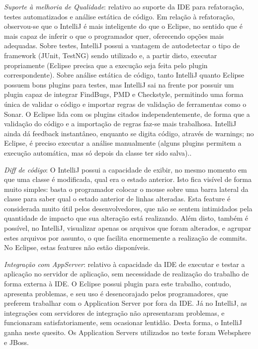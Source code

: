 \documentclass[12pt,journal,compsoc]{IEEEtran}
\begin{document}
\emph{Suporte à melhoria de Qualidade}: relativo ao suporte da IDE para refatoração, testes automatizados e análise estática de código. Em relação à refatoração, observou-se que o IntelliJ é mais inteligente do que o Eclipse, no sentido que é mais capaz de inferir o que o programador quer, oferecendo opções mais adequadas.\cite{idea_better_eclipse} Sobre testes, IntelliJ possui a vantagem de autodetectar o tipo de framework (JUnit, TestNG) sendo utilizado e, a partir disto, executar propriamente (Eclipse precisa que a execução seja feita pelo plugin correspondente). Sobre análise estática de código, tanto IntelliJ quanto Eclipse possuem bons plugins para testes, mas IntelliJ sai na frente por possuir um plugin capaz de integrar FindBugs, PMD e Checkstyle, permitindo uma forma única de validar o código e importar regras de validação de ferramentas como o Sonar. O Eclipse lida com os plugins citados independentemente, de forma que a validação do código e a importação de regras faz-se mais trabalhosa. IntelliJ ainda dá feedback instantâneo, enquanto se digita código, através de warnings; no Eclipse, é preciso executar a análise manualmente (alguns plugins permitem a execução automática, mas só depois da classe ter sido salva).\cite{dropped_eclipse}.

\emph{Diff de código}: O IntelliJ possui a capacidade de exibir, no mesmo momento em que uma classe é modificada, qual era o estado anterior. Isto fica visível de forma muito simples: basta o programador colocar o mouse sobre uma barra lateral da classe para saber qual o estado anterior de linhas alteradas. Esta feature é considerada muito útil pelos desenvolvedores, que não se sentem intimidados pela quantidade de impacto que sua alteração está realizando. Além disto, também é possível, no IntelliJ, visualizar apenas os arquivos que foram alterados, e agrupar estes arquivos por assunto, o que facilita enormemente a realização de commits. No Eclipse, estas features não estão disponíveis.

\emph{Integração com AppServer}: relativo à capacidade da IDE de executar e testar a aplicação no servidor de aplicação, sem necessidade de realização do trabalho de forma externa à IDE. O Eclipse possui plugin para este trabalho, contudo, apresenta problemas, e seu uso é desencorajado pelos programadores, que preferem trabalhar com o Application Server por fora da IDE. Já no IntelliJ, as integrações com servidores de integração não apresentaram problemas, e funcionaram satisfatoriamente, sem ocasionar lentidão. Desta forma, o IntelliJ ganha neste quesito. Os Application Servers utilizados no teste foram Websphere e JBoss.
\end{document}
